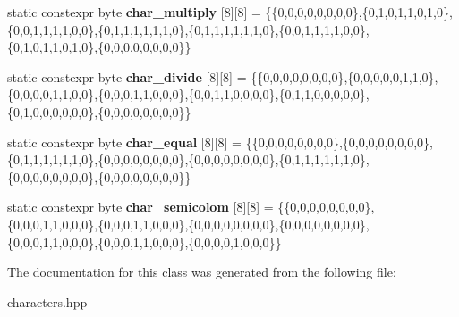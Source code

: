 \begin{DoxyCompactItemize}
\item 
static constexpr byte {\bfseries char\+\_\+multiply} \mbox{[}8\mbox{]}\mbox{[}8\mbox{]} = \{\{0,0,0,0,0,0,0,0\},\{0,1,0,1,1,0,1,0\},\{0,0,1,1,1,1,0,0\},\{0,1,1,1,1,1,1,0\},\{0,1,1,1,1,1,1,0\},\{0,0,1,1,1,1,0,0\},\{0,1,0,1,1,0,1,0\},\{0,0,0,0,0,0,0,0\}\}\hypertarget{classcharacters_aa0d9a418f74ac7cccdeb92df4e2a42e9}{}\label{classcharacters_aa0d9a418f74ac7cccdeb92df4e2a42e9}

\item 
static constexpr byte {\bfseries char\+\_\+divide} \mbox{[}8\mbox{]}\mbox{[}8\mbox{]} = \{\{0,0,0,0,0,0,0,0\},\{0,0,0,0,0,1,1,0\},\{0,0,0,0,1,1,0,0\},\{0,0,0,1,1,0,0,0\},\{0,0,1,1,0,0,0,0\},\{0,1,1,0,0,0,0,0\},\{0,1,0,0,0,0,0,0\},\{0,0,0,0,0,0,0,0\}\}\hypertarget{classcharacters_a69fef6011be8d590342ac9c55e9c6a8d}{}\label{classcharacters_a69fef6011be8d590342ac9c55e9c6a8d}

\item 
static constexpr byte {\bfseries char\+\_\+equal} \mbox{[}8\mbox{]}\mbox{[}8\mbox{]} = \{\{0,0,0,0,0,0,0,0\},\{0,0,0,0,0,0,0,0\},\{0,1,1,1,1,1,1,0\},\{0,0,0,0,0,0,0,0\},\{0,0,0,0,0,0,0,0\},\{0,1,1,1,1,1,1,0\},\{0,0,0,0,0,0,0,0\},\{0,0,0,0,0,0,0,0\}\}\hypertarget{classcharacters_a33dfd0b386b5b6215fe5e744e2797478}{}\label{classcharacters_a33dfd0b386b5b6215fe5e744e2797478}

\item 
static constexpr byte {\bfseries char\+\_\+semicolom} \mbox{[}8\mbox{]}\mbox{[}8\mbox{]} = \{\{0,0,0,0,0,0,0,0\},\{0,0,0,1,1,0,0,0\},\{0,0,0,1,1,0,0,0\},\{0,0,0,0,0,0,0,0\},\{0,0,0,0,0,0,0,0\},\{0,0,0,1,1,0,0,0\},\{0,0,0,1,1,0,0,0\},\{0,0,0,0,1,0,0,0\}\}\hypertarget{classcharacters_addfbf4f7988498e62a518781edc012fd}{}\label{classcharacters_addfbf4f7988498e62a518781edc012fd}

\end{DoxyCompactItemize}


The documentation for this class was generated from the following file\+:\begin{DoxyCompactItemize}
\item 
characters.\+hpp\end{DoxyCompactItemize}
